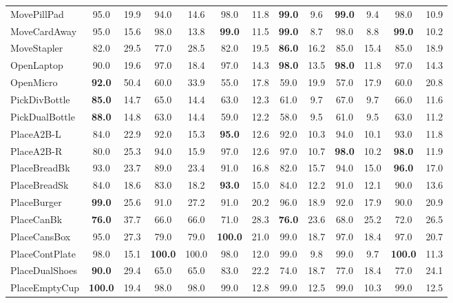\documentclass{article}
\begin{document}
\begin{table}[t]
\begin{tabular}{@{}lcccccccccccc@{}}
MovePillPad    & 95.0 & 19.9 & 94.0 & 14.6 & 98.0 & 11.8 & \textbf{99.0} & 9.6 & \textbf{99.0} & 9.4 & 98.0 & 10.9 \\
MoveCardAway   & 95.0 & 15.6 & 98.0 & 13.8 & \textbf{99.0} & 11.5 & \textbf{99.0} & 8.7 & 98.0 & 8.8 & \textbf{99.0} & 10.2 \\
MoveStapler    & 82.0 & 29.5 & 77.0 & 28.5 & 82.0 & 19.5 & \textbf{86.0} & 16.2 & 85.0 & 15.4 & 85.0 & 18.9 \\
OpenLaptop     & 90.0 & 19.6 & 97.0 & 18.4 & 97.0 & 14.3 & \textbf{98.0} & 13.5 & \textbf{98.0} & 11.8 & 97.0 & 14.3 \\
OpenMicro      & \textbf{92.0} & 50.4 & 60.0 & 33.9 & 55.0 & 17.8 & 59.0 & 19.9 & 57.0 & 17.9 & 60.0 & 20.8 \\
PickDivBottle  & \textbf{85.0} & 14.7 & 65.0 & 14.4 & 63.0 & 12.3 & 61.0 & 9.7 & 67.0 & 9.7 & 66.0 & 11.6 \\
PickDualBottle & \textbf{88.0} & 14.8 & 63.0 & 14.4 & 59.0 & 12.2 & 58.0 & 9.5 & 61.0 & 9.5 & 63.0 & 11.2 \\
PlaceA2B-L     & 84.0 & 22.9 & 92.0 & 15.3 & \textbf{95.0} & 12.6 & 92.0 & 10.3 & 94.0 & 10.1 & 93.0 & 11.8 \\
PlaceA2B-R     & 80.0 & 25.3 & 94.0 & 15.9 & 97.0 & 12.6 & 97.0 & 10.7 & \textbf{98.0} & 10.2 & \textbf{98.0} & 11.9 \\
PlaceBreadBk   & 93.0 & 23.7 & 89.0 & 23.4 & 91.0 & 16.8 & 82.0 & 15.7 & 94.0 & 15.0 & \textbf{96.0} & 17.0 \\
PlaceBreadSk   & 84.0 & 18.6 & 83.0 & 18.2 & \textbf{93.0} & 15.0 & 84.0 & 12.2 & 91.0 & 12.1 & 90.0 & 13.6 \\
PlaceBurger    & \textbf{99.0} & 25.6 & 91.0 & 27.2 & 91.0 & 20.2 & 96.0 & 18.9 & 92.0 & 17.9 & 90.0 & 20.9 \\
PlaceCanBk     & \textbf{76.0} & 37.7 & 66.0 & 66.0 & 71.0 & 28.3 & \textbf{76.0} & 23.6 & 68.0 & 25.2 & 72.0 & 26.5 \\
PlaceCansBox   & 95.0 & 27.3 & 79.0 & 79.0 & \textbf{100.0} & 21.0 & 99.0 & 18.7 & 97.0 & 18.4 & 97.0 & 20.7 \\
PlaceContPlate & 98.0 & 15.1 & \textbf{100.0} & 100.0 & 98.0 & 12.0 & 99.0 & 9.8 & 99.0 & 9.7 & \textbf{100.0} & 11.3 \\
PlaceDualShoes & \textbf{90.0} & 29.4 & 65.0 & 65.0 & 83.0 & 22.2 & 74.0 & 18.7 & 77.0 & 18.4 & 77.0 & 24.1 \\
PlaceEmptyCup  & \textbf{100.0} & 19.4 & 98.0 & 98.0 & 99.0 & 12.8 & 99.0 & 12.5 & 99.0 & 10.3 & 99.0 & 12.5 \\

\end{tabular}
\end{table}
\end{document}
